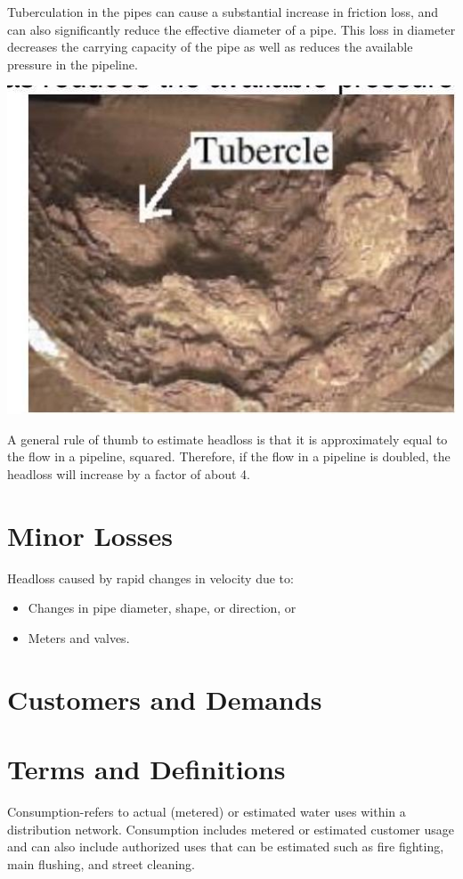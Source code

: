\documentclass[10pt]{article}
\begin{document}
Tuberculation in the pipes can cause a substantial increase in friction loss, and can also significantly reduce the effective diameter of a pipe. This loss in diameter decreases the carrying capacity of the pipe as well as reduces the available pressure in the pipeline.

\includegraphics[max width=\textwidth]{2022_10_30_098bb5f44c5986ff92a9g-32(2)}

A general rule of thumb to estimate headloss is that it is approximately equal to the flow in a pipeline, squared. Therefore, if the flow in a pipeline is doubled, the headloss will increase by a factor of about 4.

\section{Minor Losses}
Headloss caused by rapid changes in velocity due to:

\begin{itemize}
  \item Changes in pipe diameter, shape, or direction, or

  \item Meters and valves.

\end{itemize}
\section{Customers and Demands}
\section{Terms and Definitions}
Consumption-refers to actual (metered) or estimated water uses within a distribution network. Consumption includes metered or estimated customer usage and can also include authorized uses that can be estimated such as fire fighting, main flushing, and street cleaning.
\end{document}
